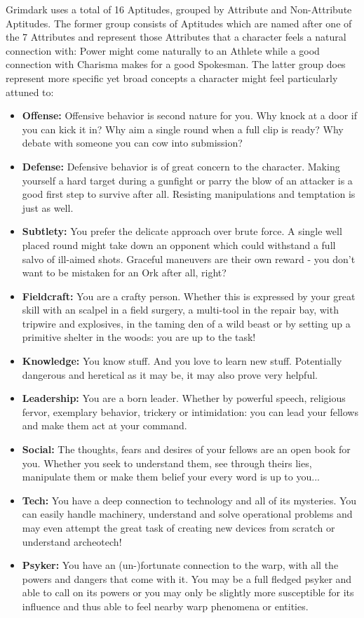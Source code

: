 Grimdark uses a total of 16 Aptitudes, grouped by Attribute and Non-Attribute Aptitudes.
The former group consists of Aptitudes which are named after one of the 7 Attributes and represent those Attributes that a character feels a natural connection with: Power might come naturally to an Athlete while a good connection with Charisma makes for a good Spokesman.
The latter group does represent more specific yet broad concepts a character might feel particularly attuned to:
\begin{itemize}
	\item \textbf{Offense:} Offensive behavior is second nature for you. Why knock at a door if you can kick it in? Why aim a single round when a full clip is ready? Why debate with someone you can cow into submission?
	\item \textbf{Defense:} Defensive behavior is of great concern to the character. Making yourself a hard target during a gunfight or parry the blow of an attacker is a good first step to survive after all. Resisting manipulations and temptation is just as well.
	\item \textbf{Subtlety:} You prefer the delicate approach over brute force. A single well placed round might take down an opponent which could withstand a full salvo of ill-aimed shots. Graceful maneuvers are their own reward - you don't want to be mistaken for an Ork after all, right?
	\item \textbf{Fieldcraft:} You are a crafty person. Whether this is expressed by your great skill with an scalpel in a field surgery, a multi-tool in the repair bay, with tripwire and explosives, in the taming den of a wild beast or by setting up a primitive shelter in the woods: you are up to the task!
	\item \textbf{Knowledge:} You know stuff. And you love to learn new stuff. Potentially dangerous and heretical as it may be, it may also prove very helpful.
	\item \textbf{Leadership:} You are a born leader. Whether by powerful speech, religious fervor, exemplary behavior, trickery or intimidation: you can lead your fellows and make them act at your command.
	\item \textbf{Social:} The thoughts, fears and desires of your fellows are an open book for you. Whether you seek to understand them, see through theirs lies, manipulate them or make them belief your every word is up to you...
	\item \textbf{Tech:} You have a deep connection to technology and all of its mysteries. You can easily handle machinery, understand and solve operational problems and may even attempt the great task of creating new devices from scratch or understand archeotech!
	\item \textbf{Psyker:} You have an (un-)fortunate connection to the warp, with all the powers and dangers that come with it. You may be a full fledged psyker and able to call on its powers or you may only be slightly more susceptible for its influence and thus able to feel nearby warp phenomena or entities.
\end{itemize}





